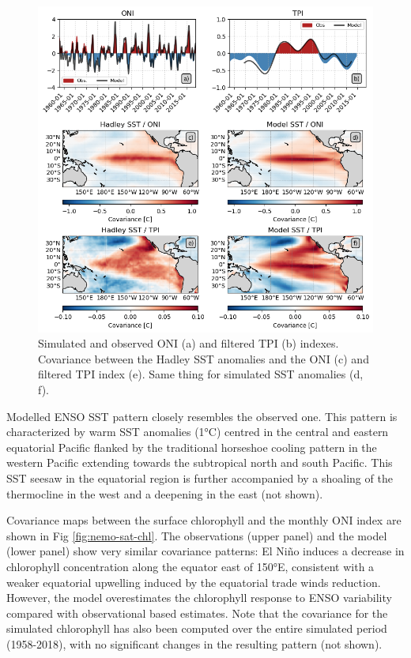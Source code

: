 \begin{figure}
	\centering
	\includegraphics[scale=0.4]{figs/fig1.png}
	\caption{Simulated and observed ONI (a) and filtered TPI (b) indexes. Covariance between the Hadley SST anomalies and the ONI (c) and filtered TPI index (e). Same thing for simulated SST anomalies (d, f).}
	\label{fig:nemo-had-sst}
\end{figure}

Modelled ENSO SST  pattern closely resembles the observed one. This pattern is characterized by warm SST anomalies (1°C) centred in the central and eastern equatorial Pacific  flanked by the traditional horseshoe cooling pattern in the western Pacific extending towards the subtropical north and south Pacific. This SST seesaw in the equatorial region is further accompanied by a shoaling of the thermocline in the west and a deepening in the east (not shown).

Covariance maps between the surface chlorophyll and the monthly ONI index are shown in Fig \ref{fig:nemo-sat-chl}. The observations (upper panel) and the model (lower panel) show very similar covariance patterns: El Niño induces a decrease in chlorophyll concentration along the equator east of 150°E, consistent with a weaker equatorial upwelling induced by the equatorial trade winds reduction. However, the model overestimates the chlorophyll response to ENSO variability compared with observational based estimates. Note that the covariance for the simulated chlorophyll has also been computed over the entire simulated period (1958-2018), with no significant changes in the resulting pattern (not shown).

